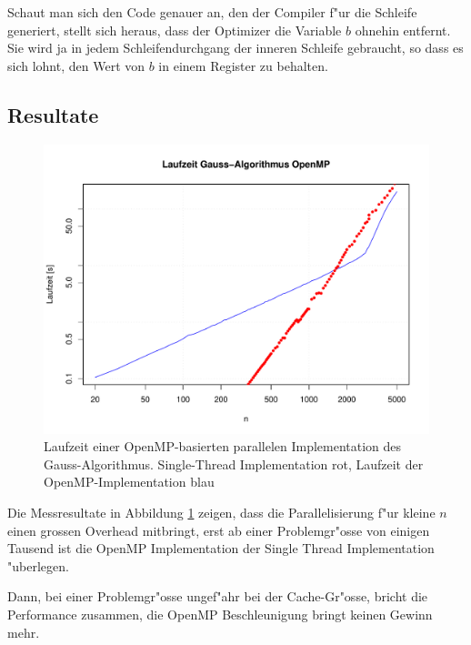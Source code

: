 Schaut man sich den Code genauer an, den der Compiler f"ur die Schleife
generiert, stellt sich heraus, dass der Optimizer die Variable $b$
ohnehin entfernt. Sie wird ja in jedem Schleifendurchgang der inneren
Schleife gebraucht, so dass es sich lohnt, den Wert von $b$ in einem
Register zu behalten.

\subsection{Resultate}
\begin{figure}
\begin{center}
\includegraphics[width=\hsize]{images/gauss-openmp.pdf}
\end{center}
\caption{Laufzeit einer OpenMP-basierten parallelen Implementation
des Gauss-Algorithmus.
Single-Thread Implementation rot, Laufzeit der OpenMP-Implementation
blau\label{openmp-performance}}
\end{figure}
Die Messresultate in Abbildung \ref{openmp-performance}
zeigen, dass die Parallelisierung f"ur kleine $n$
einen grossen Overhead mitbringt, erst ab einer Problemgr"osse von
einigen Tausend ist die OpenMP Implementation der Single Thread
Implementation "uberlegen.

Dann, bei einer Problemgr"osse ungef"ahr bei der Cache-Gr"osse,
bricht die Performance zusammen, die OpenMP Beschleunigung bringt
keinen Gewinn mehr.


